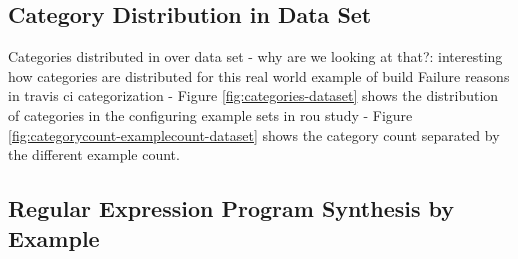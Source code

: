 \documentclass[\myrootdir/main.tex]{subfiles}
\begin{document}
\subsection{Category Distribution in Data Set}
Categories distributed in over data set
- why are we looking at that?: interesting how categories are distributed for this real world example of build Failure reasons in travis ci categorization
- Figure \ref{fig:categories-dataset} shows the distribution of categories in the configuring example sets in rou study
- Figure \ref{fig:categorycount-examplecount-dataset} shows the category count separated by the different example count.


\subsection{Regular Expression Program Synthesis by Example}
\end{document}
